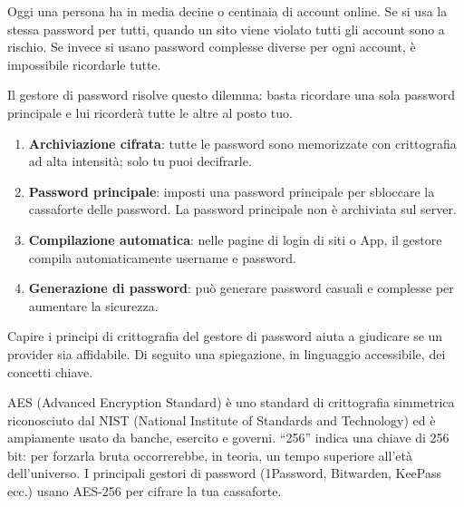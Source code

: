 


Oggi una persona ha in media decine o centinaia di account online. Se si usa la stessa password per tutti, quando un sito viene violato tutti gli account sono a rischio. Se invece si usano password complesse diverse per ogni account, è impossibile ricordarle tutte.

Il gestore di password risolve questo dilemma: basta ricordare una sola password principale e lui ricorderà tutte le altre al posto tuo.


\begin{enumerate}
  \item \textbf{Archiviazione cifrata}: tutte le password sono memorizzate con crittografia ad alta intensità; solo tu puoi decifrarle.
  \item \textbf{Password principale}: imposti una password principale per sbloccare la cassaforte delle password. La password principale non è archiviata sul server.
  \item \textbf{Compilazione automatica}: nelle pagine di login di siti o App, il gestore compila automaticamente username e password.
  \item \textbf{Generazione di password}: può generare password casuali e complesse per aumentare la sicurezza.
\end{enumerate}


Capire i principi di crittografia del gestore di password aiuta a giudicare se un provider sia affidabile. Di seguito una spiegazione, in linguaggio accessibile, dei concetti chiave.


AES (Advanced Encryption Standard) è uno standard di crittografia simmetrica riconosciuto dal NIST (National Institute of Standards and Technology) ed è ampiamente usato da banche, esercito e governi. “256” indica una chiave di 256 bit: per forzarla bruta occorrerebbe, in teoria, un tempo superiore all'età dell'universo. I principali gestori di password (1Password, Bitwarden, KeePass ecc.) usano AES-256 per cifrare la tua cassaforte.

